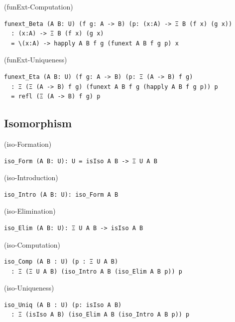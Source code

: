\documentclass{article}
\begin{document}
\begin{definition} (funExt-Computation)
\begin{lstlisting}
funext_Beta (A B: U) (f g: A -> B) (p: (x:A) -> Ξ B (f x) (g x))
  : (x:A) -> Ξ B (f x) (g x)
  = \(x:A) -> happly A B f g (funext A B f g p) x
\end{lstlisting}
\end{definition}

\begin{definition} (funExt-Uniqueness)
\begin{lstlisting}
funext_Eta (A B: U) (f g: A -> B) (p: Ξ (A -> B) f g)
  : Ξ (Ξ (A -> B) f g) (funext A B f g (happly A B f g p)) p
  = refl (Ξ (A -> B) f g) p
\end{lstlisting}
\end{definition}

\newpage
\subsection{Isomorphism}

\begin{definition} (iso-Formation)
\begin{lstlisting}
iso_Form (A B: U): U = isIso A B -> Ξ U A B
\end{lstlisting}
\end{definition}

\begin{definition} (iso-Introduction)
\begin{lstlisting}
iso_Intro (A B: U): iso_Form A B
\end{lstlisting}
\end{definition}

\begin{definition} (iso-Elimination)
\begin{lstlisting}
iso_Elim (A B: U): Ξ U A B -> isIso A B
\end{lstlisting}
\end{definition}

\begin{definition} (iso-Computation)
\begin{lstlisting}
iso_Comp (A B : U) (p : Ξ U A B)
  : Ξ (Ξ U A B) (iso_Intro A B (iso_Elim A B p)) p
\end{lstlisting}
\end{definition}

\begin{definition} (iso-Uniqueness)
\begin{lstlisting}
iso_Uniq (A B : U) (p: isIso A B)
  : Ξ (isIso A B) (iso_Elim A B (iso_Intro A B p)) p
\end{lstlisting}
\end{definition}
\end{document}
